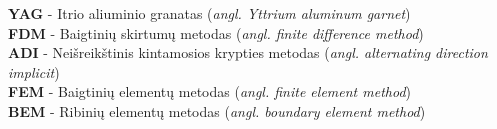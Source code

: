 
\textbf{YAG} - Itrio aliuminio granatas (\textit{angl. Yttrium aluminum garnet}) \\

\textbf{FDM} - Baigtinių skirtumų metodas (\textit{angl. finite difference method}) \\

\textbf{ADI} - Neišreikštinis kintamosios krypties metodas (\textit{angl. alternating direction implicit}) \\

\textbf{FEM} - Baigtinių elementų metodas (\textit{angl. finite element method}) \\

\textbf{BEM} - Ribinių elementų metodas (\textit{angl. boundary element method}) \\

\newpage %
